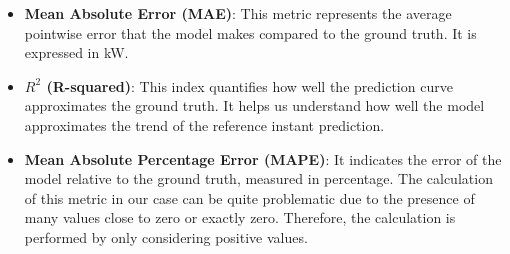 \begin{itemize}
	\item \textbf{Mean Absolute Error (MAE)}: This metric represents the average pointwise error that the model makes compared to the ground truth. It is expressed in kW.
	\item \textbf{$R^2$ (R-squared)}: This index quantifies how well the prediction curve approximates the ground truth. It helps us understand how well the model approximates the trend of the reference instant prediction.
	\item \textbf{Mean Absolute Percentage Error (MAPE)}\cite{metrics}: It indicates the error of the model relative to the ground truth, measured in percentage. The calculation of this metric in our case can be quite problematic due to the presence of many values close to zero or exactly zero. Therefore, the calculation is performed by only considering positive values.
\end{itemize}

\newpage






